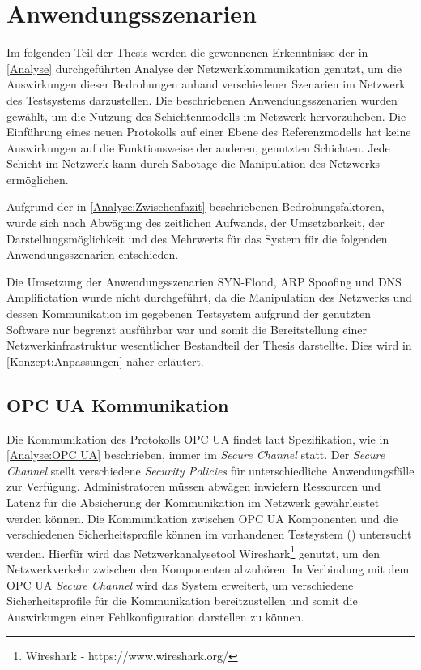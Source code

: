 \chapter{Anwendungsszenarien}
\label{Anwendungsszenarien}
Im folgenden Teil der Thesis werden die gewonnenen Erkenntnisse der in \autoref{Analyse} durchgeführten Analyse der Netzwerkkommunikation genutzt, um die Auswirkungen dieser Bedrohungen anhand verschiedener Szenarien im Netzwerk des Testsystems darzustellen. Die beschriebenen Anwendungsszenarien wurden gewählt, um die Nutzung des Schichtenmodells im Netzwerk hervorzuheben. Die Einführung eines neuen Protokolls auf einer Ebene des Referenzmodells hat keine Auswirkungen auf die Funktionsweise der anderen, genutzten Schichten. Jede Schicht im Netzwerk kann durch Sabotage die Manipulation des Netzwerks ermöglichen.

Aufgrund der in \autoref{Analyse:Zwischenfazit} beschriebenen Bedrohungsfaktoren, wurde sich nach Abwägung des zeitlichen Aufwands, der Umsetzbarkeit, der Darstellungsmöglichkeit und des Mehrwerts für das System für die folgenden Anwendungsszenarien entschieden.

Die Umsetzung der Anwendungsszenarien SYN-Flood, \ac{ARP} Spoofing und \ac{DNS} Amplifictation wurde nicht durchgeführt, da die Manipulation des Netzwerks und dessen Kommunikation im gegebenen Testsystem aufgrund der genutzten Software nur begrenzt ausführbar war und somit die Bereitstellung einer Netzwerkinfrastruktur wesentlicher Bestandteil der Thesis darstellte. Dies wird in \autoref{Konzept:Anpassungen} näher erläutert.

\section{OPC UA Kommunikation}
\label{Anwendungsszenarien:OPC UA Kommunikation}
Die Kommunikation des Protokolls \ac{OPC UA} findet laut Spezifikation, wie in \autoref{Analyse:OPC UA} beschrieben, immer im \textit{Secure Channel} statt. Der \textit{Secure Channel} stellt verschiedene \textit{Security Policies} für unterschiedliche Anwendungsfälle zur Verfügung. Administratoren müssen abwägen inwiefern Ressourcen und Latenz für die Absicherung der Kommunikation im Netzwerk gewährleistet werden können. Die Kommunikation zwischen \ac{OPC UA} Komponenten und die verschiedenen Sicherheitsprofile können im vorhandenen Testsystem (\cite{Weber2018}) untersucht werden. Hierfür wird das Netzwerkanalysetool Wireshark\footnote{Wireshark - https://www.wireshark.org/} genutzt, um den Netzwerkverkehr zwischen den Komponenten abzuhören. In Verbindung mit dem \ac{OPC UA} \textit{Secure Channel} wird das System erweitert, um verschiedene Sicherheitsprofile für die Kommunikation bereitzustellen und somit die Auswirkungen einer Fehlkonfiguration darstellen zu können.

